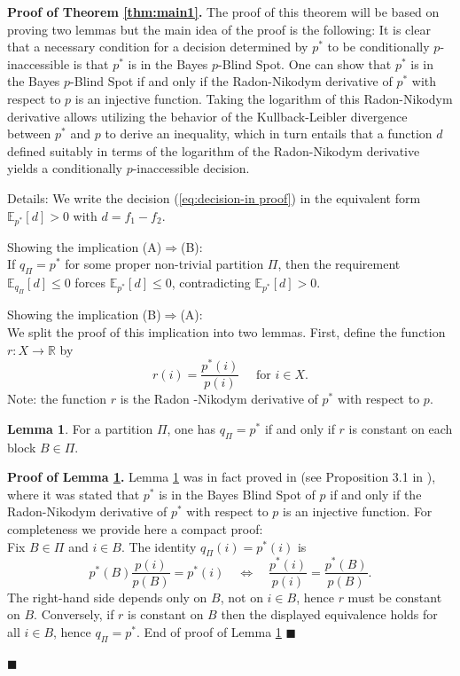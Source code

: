 \documentclass[10pt, letterpaper]{article}%
\theoremstyle{definition}
\newtheorem{lemma}[theorem]{Lemma}
\renewenvironment{proof}[1][\unskip]{%
\par
\noindent
\textbf{Proof #1.}
\noindent}
{\hfill$\blacksquare$

\bigskip}
\newcommand{\E}{\mathbb E}
\newcommand{\1}{\mathbf 1}
\begin{document}
\begin{proof}[of Theorem \ref{thm:main1}] The proof of this theorem will be based on proving two lemmas but the main idea of the proof is the following: It is clear that a necessary condition for a decision determined by $p^*$ to be conditionally $p$-inaccessible is that $p^*$ is in the Bayes $p$-Blind Spot. One can show that $p^*$ is in the Bayes $p$-Blind Spot if and only if the Radon-Nikodym derivative of $p^*$ with respect to $p$ is an injective function. Taking the logarithm of this Radon-Nikodym derivative allows utilizing the behavior of the Kullback-Leibler divergence between $p^*$ and $p$ to derive an inequality, which in turn entails that a function $d$ defined suitably in terms of the logarithm of the Radon-Nikodym derivative yields a conditionally $p$-inaccessible decision. 

Details: We write the decision (\ref{eq:decision-in proof}) in the equivalent form $\E_{p^*}[d]>0$ with $d=f_1-f_2$. 

\noindent
	Showing the implication (A)$\Rightarrow$(B): \\  If $q_\Pi=p^*$ for some proper non-trivial partition $\Pi$, then the requirement $\E_{q_\Pi}[d]\le 0$ forces $\E_{p^*}[d]\le 0$, contradicting $\E_{p^*}[d]>0$.
	
	\noindent 
    Showing the implication (B)$\Rightarrow$(A):\\ We split the proof of this implication into two lemmas. 
	First, define the function $r\colon X\to\mathbb{R}$ by
	\begin{equation}\label{eq:def-of-r}
		r(i)=\frac{p^*(i)}{p(i)} \quad \text{ for } i\in X.
	\end{equation}
	Note: the function ${r}$ is the Radon -Nikodym derivative of $p^*$ with respect to $p$.
	\begin{lemma}\label{lem:qequals}
		For a partition $\Pi$, one has $q_\Pi=p^*$ if and only if $r$ is constant on each block $B\in\Pi$.
	\end{lemma}
	\begin{proof}[of Lemma \ref{lem:qequals}]
		Lemma \ref{lem:qequals} was in fact proved in \cite{GyenisZ-Redei-Bayes-BlindSpot-Synthese} (see Proposition 3.1 in \cite{GyenisZ-Redei-Bayes-BlindSpot-Synthese}), where it was stated that $p^*$ is in the Bayes Blind Spot of $p$ if and only if the Radon-Nikodym derivative of $p^*$ with respect to $p$ is an injective function. For completeness we provide here a compact proof:  \\
        Fix $B\in\Pi$ and $i\in B$. The identity $q_\Pi(i)=p^*(i)$ is
		\[
		p^*(B)\frac{p(i)}{p(B)}=p^*(i)
		\quad\Longleftrightarrow\quad
		\frac{p^*(i)}{p(i)}=\frac{p^*(B)}{p(B)}.
		\]
		The right-hand side depends only on $B$, not on $i\in B$, hence $r$ must be constant on $B$.
		Conversely, if $r$ is constant on $B$ then the displayed equivalence holds for all $i\in B$, hence $q_\Pi=p^*$. End of proof of Lemma \ref{lem:qequals}
	\end{proof}


\end{proof}
\end{document}
